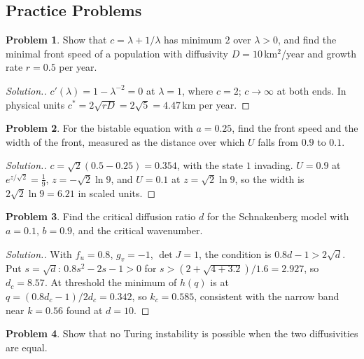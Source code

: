 \documentclass[11pt,a4paper]{article}
\numberwithin{equation}{section}
\theoremstyle{definition}
\newtheorem{problemx}{Problem}[subsection]
\newenvironment{problem}{\begin{problemx}}{\end{problemx}}
\newenvironment{solution}
  {\renewcommand{\qedsymbol}{}\begin{proof}[\textit{Solution}.]}
  {\end{proof}}
\begin{document}
\subsection{Practice Problems}

\begin{problem}
Show that $c = \lambda + 1/\lambda$ has minimum $2$ over $\lambda > 0$, and find the minimal front speed of a population with diffusivity $D = 10$\,km$^2$/year and growth rate $r = 0.5$ per year.
\end{problem}

\begin{solution}
$c'(\lambda) = 1 - \lambda^{-2} = 0$ at $\lambda = 1$, where $c = 2$; $c \to \infty$ at both ends. In physical units $c^* = 2\sqrt{rD} = 2\sqrt{5} = 4.47$\,km per year.
\end{solution}

\begin{problem}
For the bistable equation with $a = 0.25$, find the front speed and the width of the front, measured as the distance over which $U$ falls from $0.9$ to $0.1$.
\end{problem}

\begin{solution}
$c = \sqrt2(0.5 - 0.25) = 0.354$, with the state $1$ invading. $U = 0.9$ at $e^{z/\sqrt2} = \frac19$, $z = -\sqrt2\ln 9$, and $U = 0.1$ at $z = \sqrt2\ln 9$, so the width is $2\sqrt2\ln 9 = 6.21$ in scaled units.
\end{solution}

\begin{problem}
\label{prob:turingthreshold}
Find the critical diffusion ratio $d$ for the Schnakenberg model with $a = 0.1$, $b = 0.9$, and the critical wavenumber.
\end{problem}

\begin{solution}
With $f_u = 0.8$, $g_v = -1$, $\det J = 1$, the condition is $0.8d - 1 > 2\sqrt d$. Put $s = \sqrt d$: $0.8s^2 - 2s - 1 > 0$ for $s > (2 + \sqrt{4 + 3.2})/1.6 = 2.927$, so $d_c = 8.57$. At threshold the minimum of $h(q)$ is at $q = (0.8d_c - 1)/2d_c = 0.342$, so $k_c = 0.585$, consistent with the narrow band near $k = 0.56$ found at
$d = 10$.
\end{solution}

\begin{problem}
Show that no Turing instability is possible when the two diffusivities are equal.
\end{problem}
\end{document}
